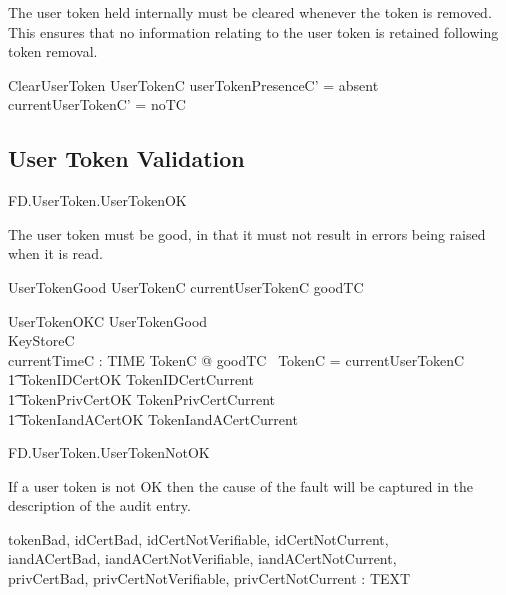 The user token held internally must be cleared whenever the token is
removed. This ensures that no information relating to the user token
is retained following token removal.

\begin{schema}{ClearUserToken}
        \Delta UserTokenC
\where
        userTokenPresenceC' = absent      
\\      currentUserTokenC' = noTC
\end{schema}

\subsection{User Token Validation}

\begin{traceunit}{FD.UserToken.UserTokenOK}
\end{traceunit}


The user token must be good, in that it must not result in errors being
raised when it is read.

\begin{schema}{UserTokenGood}
        UserTokenC
\where
 	currentUserTokenC \in \ran goodTC
\end{schema}

\begin{schema}{UserTokenOKC}
        UserTokenGood
\\      KeyStoreC
\\      currentTimeC : TIME
\where
        \exists TokenC @ goodTC~ \theta TokenC = currentUserTokenC
\\ \t1          \land TokenIDCertOK \land TokenIDCertCurrent
\\ \t1          \land TokenPrivCertOK \land TokenPrivCertCurrent
\\ \t1          \land TokenIandACertOK \land TokenIandACertCurrent

\end{schema}

\begin{traceunit}{FD.UserToken.UserTokenNotOK}
\end{traceunit}


If a user token is not OK then the cause of the fault will be captured in
the description of the audit entry. 


\begin{axdef}
        tokenBad, idCertBad, idCertNotVerifiable, idCertNotCurrent, 
\\      iandACertBad, iandACertNotVerifiable, iandACertNotCurrent,
\\      privCertBad, privCertNotVerifiable, privCertNotCurrent : TEXT
\end{axdef}
 

